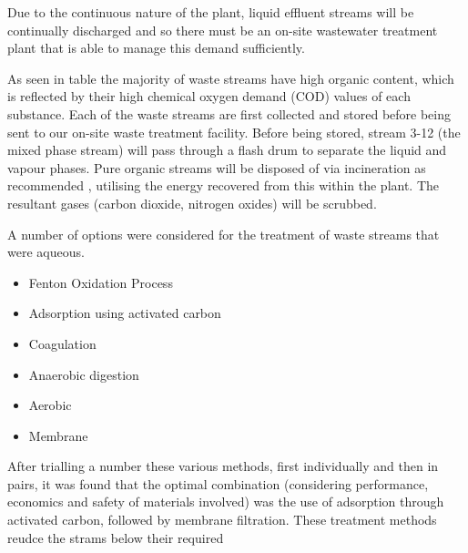 Due to the continuous nature of the plant, liquid effluent streams will be continually discharged and so there must be an on-site wastewater treatment plant that is able to manage this demand sufficiently.  %

As seen in table %
the majority of waste streams have high organic content, which is reflected by their high chemical oxygen demand (COD) values of each substance. Each of the waste streams are first collected and stored before being sent to our on-site waste treatment facility. Before being stored, stream 3-12 (the mixed phase stream) will pass through a flash drum to separate the liquid and vapour phases. Pure organic streams will be disposed of via incineration as recommended \cite{sinnott_coulson_2005}, utilising the energy recovered from this within the plant. The resultant gases (carbon dioxide, nitrogen oxides) will be scrubbed. 

A number of options were considered for the treatment of waste streams that were aqueous. 


\begin{itemize}
    \item Fenton Oxidation Process
    
    
    \item Adsorption using activated carbon
    
    
    
    
    
    \item Coagulation
    
    
    
    
    
    \item Anaerobic digestion
    
    
    
    
    
    
    \item Aerobic
    
    
    
    
    \item Membrane
    
    
    
    
    
    
\end{itemize}

After trialling a number these various methods, first individually and then in pairs, it was found that the optimal combination (considering performance, economics and safety of materials involved) was the use of adsorption through activated carbon, followed by membrane filtration. These treatment methods reudce the strams below their required 


